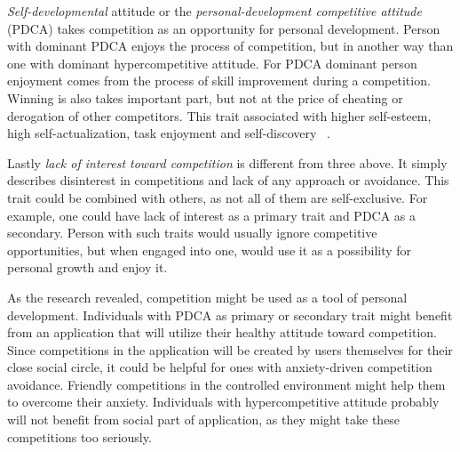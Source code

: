 \textit{Self-developmental} attitude or the \textit{personal-development competitive attitude} (PDCA)
takes competition as an opportunity for personal development.
Person with dominant PDCA enjoys the process of competition, but in another way than one with dominant hypercompetitive
attitude.
For PDCA dominant person enjoyment comes from the process of skill improvement during a competition.
Winning is also takes important part, but not at the price of cheating or derogation of other competitors.
This trait associated with higher self-esteem, high self-actualization, task enjoyment and self-discovery ~\cite{ryckman-pdca}.

Lastly \textit{lack of interest toward competition} is different from three above.
It simply describes disinterest in competitions and lack of any approach or avoidance.
This trait could be combined with others, as not all of them are self-exclusive.
For example, one could have lack of interest as a primary trait and PDCA as a secondary.
Person with such traits would usually ignore competitive opportunities, but when engaged into one,
would use it as a possibility for personal growth and enjoy it.~\cite{the-four-faces-of-competetition}

As the research revealed, competition might be used as a tool of personal development.
Individuals with PDCA as primary or secondary trait might benefit from an application that will utilize their healthy
attitude toward competition.
Since competitions in the application will be created by users themselves for their close social circle,
it could be helpful for ones with anxiety-driven competition avoidance.
Friendly competitions in the controlled environment might help them to overcome their anxiety.
Individuals with hypercompetitive attitude probably will not benefit from social part of application,
as they might take these competitions too seriously.